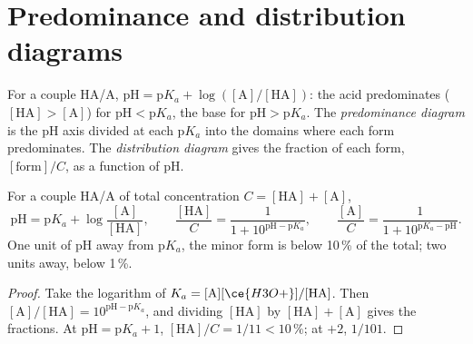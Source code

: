\section{Predominance and distribution diagrams}

\begin{definition}\label{def:b1:predominant-reaction:predominance}
For a couple HA/A, $\mathrm{pH} = \mathrm{p}K_a + \log([\mathrm{A}]/[\mathrm{HA}])$:
the acid predominates ($[\mathrm{HA}] > [\mathrm{A}]$) for
$\mathrm{pH} < \mathrm{p}K_a$, the base for $\mathrm{pH} > \mathrm{p}K_a$.
The \emph{predominance diagram} is the pH axis
divided at each $\mathrm{p}K_a$ into the domains where each form
predominates. The \emph{distribution diagram}
gives the fraction of each form, $[\text{form}]/C$, as a function of pH.
\end{definition}

\begin{proposition}\label{prop:b1:predominant-reaction:henderson}
For a couple HA/A of total concentration $C = [\mathrm{HA}] + [\mathrm{A}]$,
\[
  \mathrm{pH} = \mathrm{p}K_a + \log\frac{[\mathrm{A}]}{[\mathrm{HA}]}, \qquad
  \frac{[\mathrm{HA}]}{C} = \frac{1}{1 + 10^{\mathrm{pH} - \mathrm{p}K_a}}, \qquad
  \frac{[\mathrm{A}]}{C} = \frac{1}{1 + 10^{\mathrm{p}K_a - \mathrm{pH}}} .
\]
One unit of pH away from $\mathrm{p}K_a$, the minor form is below
10\,\% of the total; two units away, below 1\,\%.
\end{proposition}

\begin{proof}
Take the logarithm of $K_a = [\mathrm{A}][\ce{H3O+}]/[\mathrm{HA}]$. Then
$[\mathrm{A}]/[\mathrm{HA}] = 10^{\mathrm{pH}-\mathrm{p}K_a}$, and dividing
$[\mathrm{HA}]$ by $[\mathrm{HA}] + [\mathrm{A}]$ gives the fractions. At
$\mathrm{pH} = \mathrm{p}K_a + 1$, $[\mathrm{HA}]/C = 1/11 < 10\,\%$; at
$+2$, $1/101$.
\end{proof}


